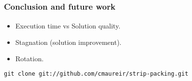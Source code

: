 \begin{frame}
    \frametitle{Conclusion and future work}
    \framesubtitle{}
    \begin{itemize}
        \item Execution time vs Solution quality.
        \item Stagnation (solution improvement).
        \item Rotation.
    \end{itemize}
    \begin{center}
        \texttt{git clone git://github.com/cmaureir/strip-packing.git}
    \end{center}
\end{frame}
